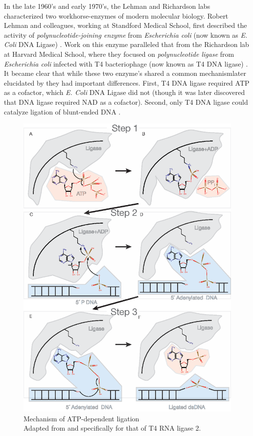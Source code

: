     In the late 1960's and early 1970's, the Lehman and Richardson labs characterized two workhorse-enzymes of modern molecular biology. Robert Lehman and colleagues, working at Standford Medical School, first described the activity of \textit{polynucleotide-joining enzyme} from \textit{Escherichia coli} (now known as \textit{E. Coli} DNA Ligase) \citep{Olivera1967b}. Work on this enzyme paralleled that from the Richardson lab at Harvard Medical School, where they focused on \textit{polynucleotide ligase} from \textit{Escherichia coli} infected with T4 bacteriophage (now known as T4 DNA ligase) \citep{Weiss1967a}. It became clear that while these two enzyme's shared a common mechanism\textemdash later elucidated by \citep{Modrich1973a}\textemdash they had important differences. First, T4 DNA ligase required ATP as a cofactor, which \textit{E. Coli} DNA Ligase did not (though it was later discovered that DNA ligase required NAD as a cofactor). Second, only T4 DNA ligase could catalyze ligation of blunt-ended DNA \citep{Tabor1987a}.

    \begin{figure}%
      \centering 
      \includegraphics{Figures/Intro/LigationMechanism.eps}
      \caption[Mechanism of Rnl2 ATP-dependent ligation]
      {
        Mechanism of ATP-dependent ligation\\[0.25cm]
        Adapted from \citep{Nandakumar2006} and specifically for that of T4 RNA ligase 2.
        }
      \label{Intro:fig:Ligation Mechanism}
      \end{figure}

